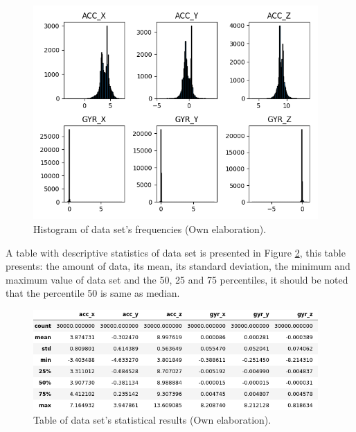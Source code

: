 \begin{figure}[h!]
  \begin{center}	\includegraphics[width=0.97\textwidth,frame]{imagenes/Cap3/histograma_sensores}
  \caption{Histogram of data set's frequencies (Own elaboration).}
  \label{fig:hist}
  \end{center}
\end{figure}

\vspace{5mm} %

A table with descriptive statistics of data set is presented in Figure \ref{tab: est}, this table presents: the amount of data, its mean, its standard deviation, the minimum and maximum value of data set and the 50, 25 and 75 percentiles, it should be noted that the percentile 50 is same as median.

\begin{figure}[h!]
  \begin{center}	\includegraphics[width=0.97\textwidth,frame]{imagenes/Cap3/describe_data}
  \caption{Table of data set's statistical results (Own elaboration).}
  \label{tab: est}
  \end{center}
\end{figure}

